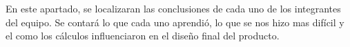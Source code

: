 
\tab En este apartado, se localizaran las conclusiones de cada uno de los integrantes del equipo. Se contará lo que cada uno aprendió, lo que se nos hizo mas difícil y el como los cálculos influenciaron en el diseño final del producto.